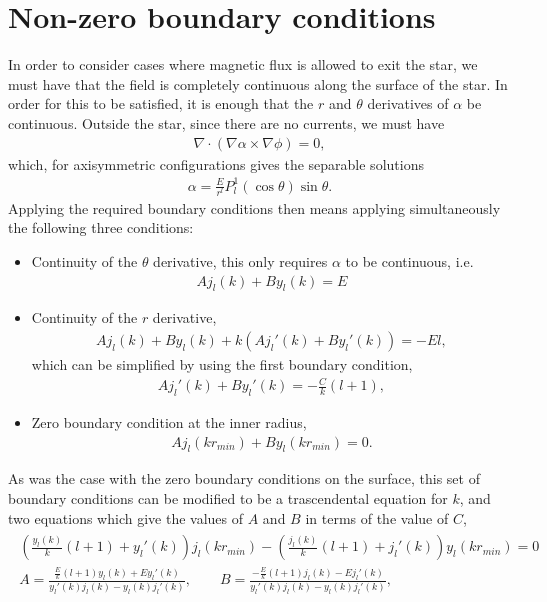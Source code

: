 \documentclass[letterpaper,10pt]{article}
\begin{document}
\section*{Non-zero boundary conditions}
In order to consider cases where magnetic flux is allowed to exit the star, we must have that the field is completely continuous along the surface of the star. In order for this to be satisfied, it is enough that the $r$ and $\theta$ derivatives of $\alpha$ be continuous. Outside the star, since there are no currents, we must have
\begin{eqnarray}
\nabla\cdot(\nabla\alpha\times\nabla\phi)=0,
\end{eqnarray}
which, for axisymmetric configurations gives the separable solutions
\begin{eqnarray}
\alpha=\frac{E}{r^l}P_l^{1}(\cos\theta)\sin\theta.
\end{eqnarray}
Applying the required boundary conditions then means applying simultaneously the following three conditions:
\begin{itemize}
\item Continuity of the $\theta$ derivative, this only requires $\alpha$ to be continuous, i.e.
\begin{eqnarray}
Aj_l(k)+By_l(k)=E
\end{eqnarray}
\item Continuity of the $r$ derivative,
\begin{eqnarray}
Aj_l(k)+By_l(k)+k(Aj_l'(k)+By_l'(k))=-El,
\end{eqnarray}
which can be simplified by using the first boundary condition,
\begin{eqnarray}
Aj_l'(k)+By_l'(k)=-\frac{C}{k}(l+1),
\end{eqnarray}
\item Zero boundary condition at the inner radius,
\begin{eqnarray}
Aj_l(kr_{min})+By_l(kr_{min})=0.
\end{eqnarray}
\end{itemize}
As was the case with the zero boundary conditions on the surface, this set of boundary conditions can be modified to be a trascendental equation for $k$, and two equations which give the values of $A$ and $B$ in terms of the value of $C$,
\begin{eqnarray}
\begin{aligned}
\left(\frac{y_l(k)}{k}(l+1)+y_l'(k)\right)j_l(kr_{min})-\left(\frac{j_l(k)}{k}(l+1)+j_l'(k)\right)y_l(kr_{min})=0\\
A=\frac{\frac{E}{k}(l+1)y_l(k)+Ey_l'(k)}{y_l'(k)j_l(k)-y_l(k)j_l'(k)},\qquad
B=\frac{-\frac{E}{k}(l+1)j_l(k)-Ej_l'(k)}{y_l'(k)j_l(k)-y_l(k)j_l'(k)},
\end{aligned}
\end{eqnarray}
\end{document}
